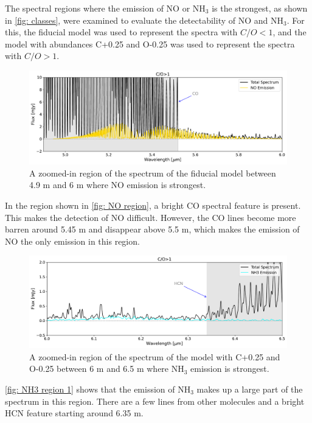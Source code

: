 \documentclass[oneside, single, authoryear, semicolon, 12pt]{lion-msc}
\newcommand{\4}{$_4$}
\newcommand{\3}{$_3$}
\newcommand{\2}{$_2$}
\begin{document}
The spectral regions where the emission of NO or NH\3 is the strongest, as shown in \autoref{fig: classes}, were examined to evaluate the detectability of NO and NH\3. For this, the fiducial model was used to represent the spectra with $C/O<1$, and the model with abundances C+0.25 and O-0.25 was used to represent the spectra with $C/O>1$.

\begin{figure}[H]
    \centering
    \includegraphics[width=\linewidth]{Figures/NO_region.pdf}
    \caption{A zoomed-in region of the spectrum of the fiducial model between 4.9 \textmu m and 6 \textmu m where NO emission is strongest.}
    \label{fig: NO region}
\end{figure}

In the region shown in \autoref{fig: NO region}, a bright CO spectral feature is present. This makes the detection of NO difficult. However, the CO lines become more barren around 5.45 \textmu m and disappear above 5.5 \textmu m, which makes the emission of NO the only emission in this region. 

\begin{figure}[H]
    \centering
    \includegraphics[width=\linewidth]{Figures/NH3_region1.pdf}
    \caption{A zoomed-in region of the spectrum of the model with C+0.25 and O-0.25 between 6 \textmu m and 6.5 \textmu m where NH\3 emission is strongest.}
    \label{fig: NH3 region 1}
\end{figure}

\autoref{fig: NH3 region 1} shows that the emission of NH\3 makes up a large part of the spectrum in this region. There are a few lines from other molecules and a bright HCN feature starting around 6.35 \textmu m.
\end{document}
